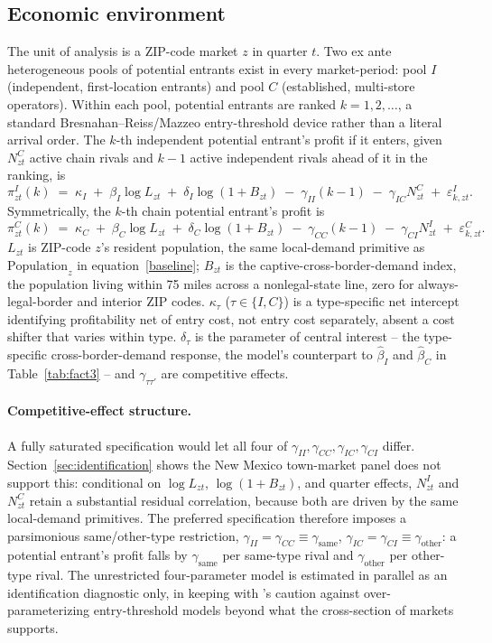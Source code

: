 \documentclass[english,12pt]{article}
\begin{document}
\subsection{Economic environment}
\label{sec:environment}

The unit of analysis is a ZIP-code market $z$ in quarter $t$. Two ex ante heterogeneous pools of potential entrants exist in every market-period: pool $I$ (independent, first-location entrants) and pool $C$ (established, multi-store operators). Within each pool, potential entrants are ranked $k=1,2,\dots$, a standard Bresnahan--Reiss/Mazzeo entry-threshold device rather than a literal arrival order. The $k$-th independent potential entrant's profit if it enters, given $N^C_{zt}$ active chain rivals and $k-1$ active independent rivals ahead of it in the ranking, is
\begin{equation}
\pi^I_{zt}(k) \;=\; \kappa_I \;+\; \beta_I \log L_{zt} \;+\; \delta_I \log(1+B_{zt}) \;-\; \gamma_{II}(k-1) \;-\; \gamma_{IC} N^C_{zt} \;+\; \varepsilon^I_{k,zt}. \label{eq:piI}
\end{equation}
Symmetrically, the $k$-th chain potential entrant's profit is
\[
\pi^C_{zt}(k) \;=\; \kappa_C \;+\; \beta_C \log L_{zt} \;+\; \delta_C \log(1+B_{zt}) \;-\; \gamma_{CC}(k-1) \;-\; \gamma_{CI} N^I_{zt} \;+\; \varepsilon^C_{k,zt}.
\]
$L_{zt}$ is ZIP-code $z$'s resident population, the same local-demand primitive as $\text{Population}_z$ in equation~\eqref{baseline}; $B_{zt}$ is the captive-cross-border-demand index, the population living within 75 miles across a nonlegal-state line, zero for always-legal-border and interior ZIP codes. $\kappa_\tau$ ($\tau\in\{I,C\}$) is a type-specific net intercept identifying profitability net of entry cost, not entry cost separately, absent a cost shifter that varies within type. $\delta_\tau$ is the parameter of central interest -- the type-specific cross-border-demand response, the model's counterpart to $\hat\beta_I$ and $\hat\beta_C$ in Table~\ref{tab:fact3} -- and $\gamma_{\tau\tau'}$ are competitive effects.

\paragraph{Competitive-effect structure.} A fully saturated specification would let all four of $\gamma_{II}, \gamma_{CC}, \gamma_{IC}, \gamma_{CI}$ differ. Section~\ref{sec:identification} shows the New Mexico town-market panel does not support this: conditional on $\log L_{zt}$, $\log(1+B_{zt})$, and quarter effects, $N^I_{zt}$ and $N^C_{zt}$ retain a substantial residual correlation, because both are driven by the same local-demand primitives. The preferred specification therefore imposes a parsimonious same/other-type restriction, $\gamma_{II}=\gamma_{CC}\equiv\gamma_{\text{same}}$, $\gamma_{IC}=\gamma_{CI}\equiv\gamma_{\text{other}}$: a potential entrant's profit falls by $\gamma_{\text{same}}$ per same-type rival and $\gamma_{\text{other}}$ per other-type rival. The unrestricted four-parameter model is estimated in parallel as an identification diagnostic only, in keeping with \citet{BresnahanReiss1991}'s caution against over-parameterizing entry-threshold models beyond what the cross-section of markets supports.
\end{document}

